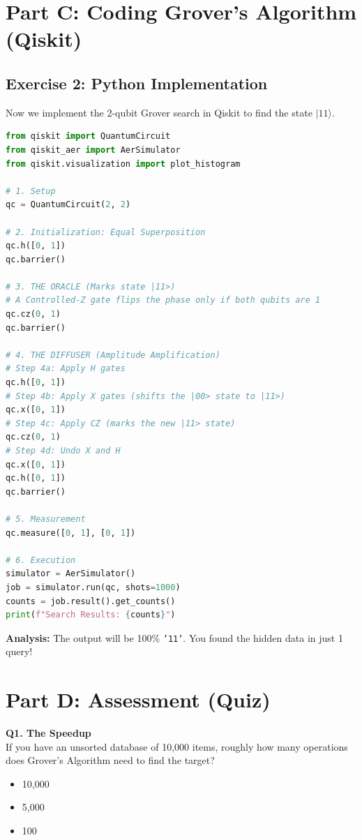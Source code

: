 \documentclass[a4paper,11pt]{article}
\begin{document}
\newpage

\section{Part C: Coding Grover's Algorithm (Qiskit)}

\subsection{Exercise 2: Python Implementation}
Now we implement the 2-qubit Grover search in Qiskit to find the state $|11\rangle$.

\begin{tcolorbox}[colback=green!5!white,colframe=green!75!black,title=Coding Task: Grover for $|11\rangle$]
\begin{lstlisting}[language=Python]
from qiskit import QuantumCircuit
from qiskit_aer import AerSimulator
from qiskit.visualization import plot_histogram

# 1. Setup
qc = QuantumCircuit(2, 2)

# 2. Initialization: Equal Superposition
qc.h([0, 1])
qc.barrier()

# 3. THE ORACLE (Marks state |11>)
# A Controlled-Z gate flips the phase only if both qubits are 1
qc.cz(0, 1)
qc.barrier()

# 4. THE DIFFUSER (Amplitude Amplification)
# Step 4a: Apply H gates
qc.h([0, 1])
# Step 4b: Apply X gates (shifts the |00> state to |11>)
qc.x([0, 1])
# Step 4c: Apply CZ (marks the new |11> state)
qc.cz(0, 1)
# Step 4d: Undo X and H
qc.x([0, 1])
qc.h([0, 1])
qc.barrier()

# 5. Measurement
qc.measure([0, 1], [0, 1])

# 6. Execution
simulator = AerSimulator()
job = simulator.run(qc, shots=1000)
counts = job.result().get_counts()
print(f"Search Results: {counts}")
\end{lstlisting}
\textbf{Analysis:} The output will be 100\% \texttt{'11'}. You found the hidden data in just 1 query!
\end{tcolorbox}

\section{Part D: Assessment (Quiz)}

\textbf{Q1. The Speedup}\\
If you have an unsorted database of 10,000 items, roughly how many operations does Grover's Algorithm need to find the target?
\begin{itemize}
    \item[A)] 10,000
    \item[B)] 5,000
    \item[C)] 100
\end{itemize}
\end{document}

